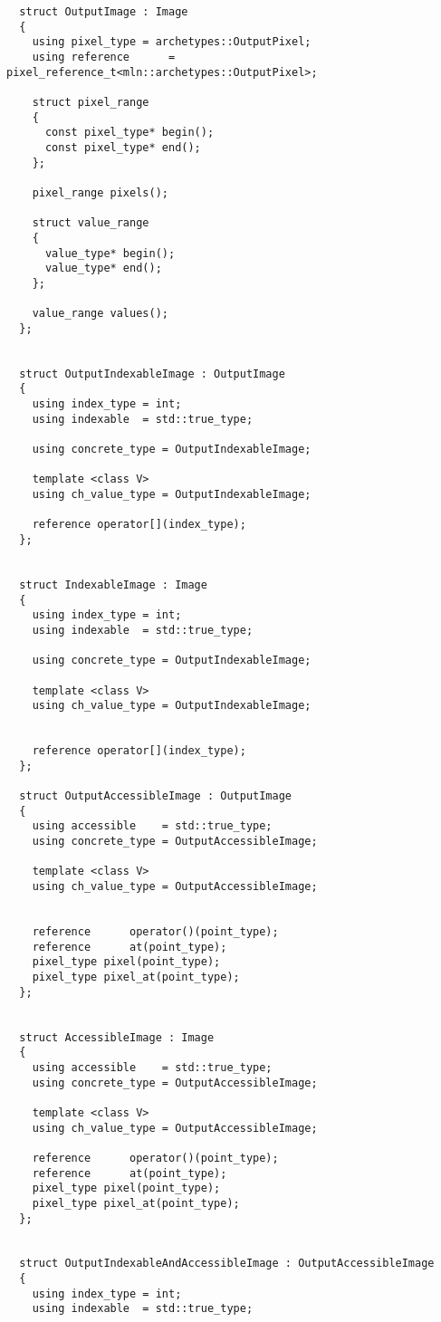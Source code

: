 \begin{verbatim}
  struct OutputImage : Image
  {
    using pixel_type = archetypes::OutputPixel;
    using reference      = pixel_reference_t<mln::archetypes::OutputPixel>;

    struct pixel_range
    {
      const pixel_type* begin();
      const pixel_type* end();
    };

    pixel_range pixels();

    struct value_range
    {
      value_type* begin();
      value_type* end();
    };

    value_range values();
  };


  struct OutputIndexableImage : OutputImage
  {
    using index_type = int;
    using indexable  = std::true_type;

    using concrete_type = OutputIndexableImage;

    template <class V>
    using ch_value_type = OutputIndexableImage;

    reference operator[](index_type);
  };


  struct IndexableImage : Image
  {
    using index_type = int;
    using indexable  = std::true_type;

    using concrete_type = OutputIndexableImage;

    template <class V>
    using ch_value_type = OutputIndexableImage;


    reference operator[](index_type);
  };

  struct OutputAccessibleImage : OutputImage
  {
    using accessible    = std::true_type;
    using concrete_type = OutputAccessibleImage;

    template <class V>
    using ch_value_type = OutputAccessibleImage;


    reference      operator()(point_type);
    reference      at(point_type);
    pixel_type pixel(point_type);
    pixel_type pixel_at(point_type);
  };


  struct AccessibleImage : Image
  {
    using accessible    = std::true_type;
    using concrete_type = OutputAccessibleImage;

    template <class V>
    using ch_value_type = OutputAccessibleImage;

    reference      operator()(point_type);
    reference      at(point_type);
    pixel_type pixel(point_type);
    pixel_type pixel_at(point_type);
  };


  struct OutputIndexableAndAccessibleImage : OutputAccessibleImage
  {
    using index_type = int;
    using indexable  = std::true_type;


\end{verbatim}
